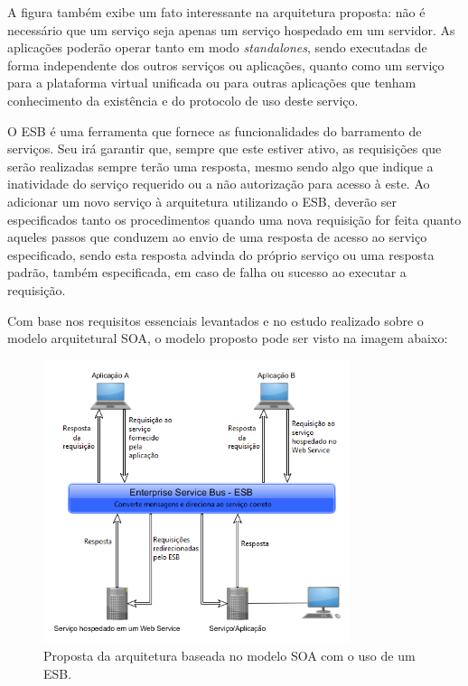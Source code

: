 A figura também exibe um fato interessante na arquitetura proposta: não é necessário que um serviço seja apenas um serviço hospedado em um servidor. As aplicações poderão operar tanto em modo \textit{standalones}, sendo executadas de forma independente dos outros serviços ou aplicações, quanto como um serviço para a plataforma virtual unificada ou para outras aplicações que tenham conhecimento da existência e do protocolo de uso deste serviço.

O ESB é uma ferramenta que fornece as funcionalidades do barramento de serviços. Seu irá garantir que, sempre que este estiver ativo, as requisições que serão realizadas sempre terão uma resposta, mesmo sendo algo que indique a inatividade do serviço requerido ou a não autorização para acesso à este. Ao adicionar um novo serviço à arquitetura utilizando o ESB, deverão ser especificados tanto os procedimentos quando uma nova requisição for feita quanto aqueles passos que conduzem ao envio de uma resposta de acesso ao serviço especificado, sendo esta resposta advinda do próprio serviço ou uma resposta padrão, também especificada, em caso de falha ou sucesso ao executar a requisição.

Com base nos requisitos essenciais levantados e no estudo realizado sobre o modelo arquitetural SOA, o modelo proposto pode ser visto na imagem abaixo:

\begin{figure}[htb]
\centering
\includegraphics[width=0.8\textwidth]{figuras/uso_esb.PNG}
\caption{Proposta da arquitetura baseada no modelo SOA com o uso de um ESB.}
\label{uso_esb}
\end{figure}

